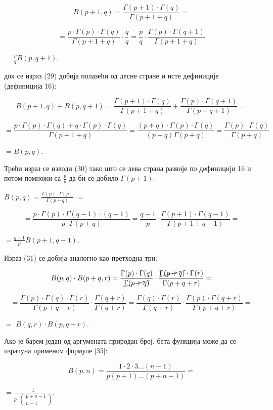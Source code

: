 \[B(p + 1,q) = \frac{\Gamma(p + 1) \cdot \Gamma(q)}{\Gamma(p + 1 + q)} =\]

\[= \frac{p \cdot \Gamma(p) \cdot \Gamma(q)}{\Gamma(p + 1 + q)} \cdot \frac{q}{q} = \frac{p}{q} \cdot \frac{\Gamma(p) \cdot \Gamma(q + 1)}{\Gamma(p + 1 + q)}\]

\(= \frac{p}{q}B(p,q + 1)\),

док се израз (29) добија полазећи од десне стране и исте дефиниције
(дефиниција 16):

\[B(p + 1,q) + B(p,q + 1) = \frac{\Gamma(p + 1) \cdot \Gamma(q)}{\Gamma(p + 1 + q)} + \frac{\Gamma(p) \cdot \Gamma(q + 1)}{\Gamma(p + q + 1)} =\]

\[= \frac{p \cdot \Gamma(p) \cdot \Gamma(q) + q \cdot \Gamma(p) \cdot \Gamma(q)}{\Gamma(p + 1 + q)} = \frac{(p + q) \cdot \Gamma(p) \cdot \Gamma(q)}{(p + q)\Gamma(p + q)} = \frac{\Gamma(p) \cdot \Gamma(q)}{\Gamma(p + q)}\]

\(= B(p,q)\).

Трећи израз се изводи (30) тако што се лева страна развије по дефиницији
16 и потом помножи са \(\frac{p}{p}\) да би се добило \(\Gamma(p + 1)\):

\(B(p,q) = \frac{\Gamma(p) \cdot \Gamma(p)}{\Gamma(p + q)}\) \(=\)

\[= \frac{p \cdot \Gamma(p) \cdot \Gamma(q - 1) \cdot (q - 1)}{p \cdot \Gamma(p + q)} = \frac{q - 1}{p} \cdot \frac{\Gamma(p + 1) \cdot \Gamma(q - 1)}{\Gamma(p + 1 + q - 1)} =\]

\(= \frac{q - 1}{p}B(p + 1,q - 1)\).

Израз (31) се добија аналогно као претходна три:

\[B(p,q) \cdot B(p + q,r) = \frac{\Gamma(p) \cdot \Gamma(q)}{\cancel{\Gamma(p + q)}} \cdot \frac{\cancel{\Gamma(p + q)} \cdot \Gamma(r)}{\Gamma(p + q + r)} =\]

\[= \frac{\Gamma(p) \cdot \Gamma(q) \cdot \Gamma(r)}{\Gamma(p + q + r)} \cdot \frac{\Gamma(q + r)}{\Gamma(q + r)} = \frac{\Gamma(q) \cdot \Gamma(r)}{\Gamma(q + r)} \cdot \frac{\Gamma(p) \cdot \Gamma(q + r)}{\Gamma(p + q + r)} =\]

\(=\) \(B(q,r) \cdot B(p,q + r)\).

Ако је барем један од аргумената природан број, бета функција може да се
израчуна применом формуле {[}35{]}:

\[B(p,n) = \frac{1 \cdot 2 \cdot 3...(n - 1)}{p(p + 1)...(p + n - 1)} =\]

\(= \frac{1}{p \cdot \left( \begin{array}{r}
p + n - 1 \\
n - 1
\end{array} \right)}\).

